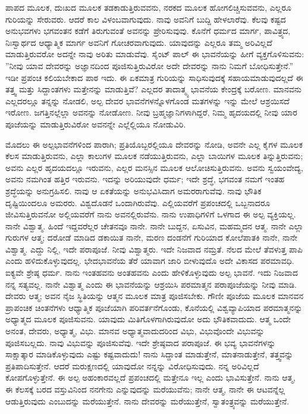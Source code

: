 ಪಾಪದ ಮೂಲಕ, ದುಃಖದ ಮೂಲಕ ತಡಕಾಡುತ್ತಿರುವವನು, ನರಕದ ಮೂಲಕ ಹೋಗಲಿಚ್ಚಿಸುವವನು, ಎಲ್ಲರೂ ಗುರಿಯನ್ನು ಸೇರುವರು. ಆದರೆ ಕಾಲ ವಿಳಂಬವಾಗುವುದು. ನಾವು ಅವನಿಗೆ ಬುದ್ದಿ ಹೇಳಲಾರೆವು. ಕೆಲವು ಕಷ್ಟದ ಅನುಭವಗಳು ಭಗವಂತನ ಕಡೆಗೆ ತಿರುಗುವಂತೆ ಅವನನ್ನು ಪ್ರೇರಿಸುವುವು. ಕೊನೆಗೆ ಧರ್ಮದ ಮಾರ್ಗ, ಪಾವಿತ್ರ್ಯದ, ನಿಃಸ್ವಾರ್ಥದ ಆಧ್ಯಾತ್ಮಿಕ ಮಾರ್ಗ ಅವನಿಗೆ ಗೋಚರವಾಗುವುದು. ಯಾವುದನ್ನು ಎಲ್ಲರೂ ತಮ್ಮ ಅರಿವಿಲ್ಲದೆ ಮಾಡುತ್ತಿರುವರೋ ಅದನ್ನೇ ನಾವು ಅರಿತು ಮಾಡುವೆವು. ಸೈಂಟ್ ಪಾಲ್ ಈ ಭಾವನೆಯನ್ನು ಹೀಗೆ ವ್ಯಕ್ತಗೊಳಿಸುವನು: ''ನೀವು ಯಾವ ದೇವರನ್ನು ಅಜ್ಞಾನದಿಂದ ಪೂಜಿಸುತ್ತಿರುವಿರೋ ಅದೇ ದೇವರನ್ನು ನಾನು ನಿಮಗೆ ಬೋಧಿಸುತ್ತೇನೆ.'' ಇಡೀ ಪ್ರಪಂಚ ಕಲಿಯಬೇಕಾದ ಪಾಠ ಇದು. ಈ ಏಕಮಾತ್ರ ಗುರಿಯನ್ನು ಸಾಧಿಸುವುದಕ್ಕೆ ಸಹಾಯಮಾಡುವುದಲ್ಲದೆ ಈ ತತ್ತ್ವ ಮತ್ತು ಸಿದ್ದಾಂತಗಳು ಮತ್ತೇನನ್ನು ಮಾಡುತ್ತಿವೆ? ಎಲ್ಲದರ ತಾದಾತ್ಮ್ಯ ಭಾವನೆಯ ಕೇಂದ್ರಕ್ಕೆ ಬರೋಣ. ಮಾನವನು ಎಲ್ಲದರಲ್ಲೂ ತನ್ನನ್ನು ನೋಡಲಿ, ಅಲ್ಪ ದೇವರ ಭಾವನೆಗಳನ್ನೊಳಗೊಂಡ ಮತಗಳನ್ನು ಇನ್ನು ಮೇಲೆ ಆಶ್ರಯಿಸದೆ ಇರೋಣ. ಜಗತ್ತಿನಲ್ಲೆಲ್ಲಾ ಅವನನ್ನು ನೋಡೋಣ. ನೀವು ಬ್ರಹ್ಮಜ್ಞಾನಿಗಳಾಗಿದ್ದರೆ, ನಿಮ್ಮ ಹೃದಯದಲ್ಲಿ ನೀವು ಯಾರ ಪೂಜೆಯನ್ನು ಮಾಡುತ್ತಿರುವಿರೋ ಅವನನ್ನೇ ಎಲ್ಲೆಲ್ಲಿಯೂ ನೋಡುವಿರಿ.

ಮೊದಲು ಈ ಅಲ್ಪಭಾವನೆಗಳಿಂದ ಪಾರಾಗಿ; ಪ್ರತಿಯೊಬ್ಬರಲ್ಲಿಯೂ ದೇವರನ್ನು ನೋಡಿ, ಅವನೇ ಎಲ್ಲ ಕೈಗಳ ಮೂಲಕ ಕೆಲಸ ಮಾಡುತ್ತಿರುವನು, ಎಲ್ಲಾ ಕಾಲುಗಳ ಮೂಲಕ ನಡೆಯುತ್ತಿರುವನು, ಎಲ್ಲಾ ಬಾಯಿಗಳ ಮೂಲಕ ತಿನ್ನುತ್ತಿರುವನು; ಅವನು ಎಲ್ಲರ ಹೃದಯದಲ್ಲೂ ಇರುವನು, ಎಲ್ಲರ ಮನಸ್ಸಿನ ಮೂಲಕ ಆಲೋಚಿಸುತ್ತಿರುವನು. ಅವನು ಸ್ವಯಂವೇದ್ಯ, ಅವನು ನಮಗಿಂತ ಹತ್ತಿರ ಇರುವನು. ಇದನ್ನು ಅರಿಯುವುದೇ ಧರ್ಮ; ಇದೇ ಶ್ರದ್ಧೆ, ಭಗವಂತ ನಮಗೆ ಇಂತಹ ಶ್ರದ್ಧೆಯನ್ನು ಅನುಗ್ರಹಿಸಲಿ. ನಾವು ಆ ಏಕತೆಯನ್ನು ಅನುಭವಿಸಿದಾಗ ಅಮರರಾಗುವೆವು. ನಾವು ಭೌತಿಕ ದೃಷ್ಟಿಯಿಂದಲೂ ಅಮರರು. ವಿಶ್ವದೊಡನೆ ಒಂದಾಗಿರುವೆವು. ಎಲ್ಲಿಯವರೆಗೆ ಪ್ರಪಂಚದಲ್ಲಿ ಒಬ್ಬನಾದರೂ ಜೀವಿಸುತ್ತಿರುವನೋ ಅಲ್ಲಿಯವರೆಗೆ ನಾನು ಅವನಲ್ಲಿರುವೆನು. ನಾನು ಉಪಾಧಿಗಳಿಗೆ ಒಳಗಾದ ಈ ಅಲ್ಪ ವ್ಯಕ್ತಿಯಲ್ಲ. ನಾನೇ ವಿಶ್ವಾತ್ಮ. ಹಿಂದೆ ಇದ್ದವರೆಲ್ಲರ ಚೇತನವೂ ನಾನೇ. ನಾನೇ ಬುದ್ದನ, ಏಸುವಿನ, ಮಹಮ್ಮದನ ಆತ್ಮ. ನಾನೇ ಎಲ್ಲಾ ಗುರುಗಳ ಆತ್ಮ; ದರೋಡೆ ಮಾಡಿದ ಡಕಾಯಿತ ನಾನೇ, ಮರಣ ದಂಡನೆಗೆ ಗುರಿಯಾದ ಕೋಲೆಪಾತಕಿ ನಾನೇ, ನಾನೇ ವಿಶ್ವಾತ್ಮ. ಎದ್ದು ನಿಲ್ಲಿ, ಇದೇ ಪರಾಪೂಜೆ. ನೀವು ವಿಶ್ವಾತ್ಮರು. ಇದೇ ನಿಜವಾದ ನಮ್ರತೆ. ನೆಲದ ಮೇಲೆ ತೆವಳುತ್ತ ಪಾಪಿ ಎಂದು ಹಳಿದುಕೊಳ್ಳುವುದಲ್ಲ. ಭೇದಭಾವನೆಯ ತೆರೆ ಯಾವಾಗ ಜಾರಿ ಬೀಳುವುದೊ ಅದೇ ವಿಕಾಸದ ಪರಮಾವಧಿ. ಐಕ್ಯವೇ ಶ್ರೇಷ್ಠ ಧರ್ಮ. ನಾನು ಇಂತಹವನು ಅಂತಹವನು ಎಂದು ಹೇಳಿಕೊಳ್ಳುವುದು ಅಲ್ಪ ಭಾವನೆ. ಇದು ನಿಜವಾದ ನನ್ನ ಸತ್ಯವಲ್ಲ. ನಾನೇ ವಿಶ್ವಾತ್ಮ ಎಂದು ಈ ಭಾವನೆಯನ್ನು ಆಶ್ರಯಿಸಿ ಪರಮಾತ್ಮನ ಪರಾಪೂಜೆಯನ್ನು ನೀವು ಮಾಡಿ. ದೇವರು ಆತ್ಮ; ಅವನ ನೈಜ ಸ್ಥಿತಿಯನ್ನು ಆತ್ಮನ ಮೂಲಕ ಮಾತ್ರ ಪೂಜಿಸಬೇಕು. ಗೌಣೀ ಪೂಜೆಯ ಮೂಲಕ ಮಾನವನ ಪ್ರಾಪಂಚಿಕ ಚಿಂತನೆಗಳು ಆಧ್ಯಾತ್ಮಿಕ ಪೂಜೆಯಾಗಿ ಪರಿವರ್ತನೆಗೊಂಡು, ಕೊನೆಯಲ್ಲಿ ವಿಶ್ವವ್ಯಾಪಿಯಾದ ಪರಮಾತ್ಮನನ್ನು ಅಧ್ಯಾತ್ಮದ ಮೂಲಕ ಪೂಜಿಸುವನು. ಯಾವುದು ಮಿತಿಗೊಳಗಾಗಿರುವುದೋ ಅದು ಭೌತಿಕವಾದುದು. ಆತ್ಮ ಒಂದೇ ಅನಂತ, ದೇವರು, ಅಧ್ಯಾತ್ಮ, ವಿಭು. ಮಾನವ ಅಧ್ಯಾತ್ಮವಾದುದರಿಂದ ವಿಭು, ವಿಭುವೊಂದೇ ವಿಭುವನ್ನು ಪೂಜಿಸಬಲ್ಲದು. ನಾವು ವಿಭುವನ್ನು ಪೂಜಿಸುವೆವು. ಇದೇ ಶ್ರೇಷ್ಠವಾದ ಪರಾಪೂಜೆ. ಈ ಭವ್ಯ ಭಾವನೆಗಳನ್ನು ಸಾಕ್ಷಾತ್ಕಾರ ಮಾಡಿಕೊಳ್ಳುವುದು ಎಷ್ಟು ಕಷ್ಟವಾದುದು! ನಾನು ಸಿದ್ದಾಂತ ಮಾಡುತ್ತೇನೆ, ಮಾತನಾಡುತ್ತೇನೆ, ತತ್ತ್ವವನ್ನು ಪ್ರತಿಪಾದಿಸುತ್ತೇನೆ. ಆದರೆ ಮರುಕ್ಷಣದಲ್ಲಿ ಯಾವುದೋ ನನ್ನನ್ನು ವಿರೋಧಿಸುವುದು. ನನ್ನ ಅರಿವಿಲ್ಲದೆ ಕೋಪಗೊಳ್ಳುತ್ತೇನೆ. ಈ ಅಲ್ಪ ಅಹಂಕಾರವಲ್ಲದೆ ಪ್ರಪಂಚದಲ್ಲಿ ಮತ್ತೇನೂ ಇಲ್ಲ ಎಂದು ಭಾವಿಸುತ್ತೇನೆ. ನಾನು ಆತ್ಮ, ಈ ಕೆಲಸಕ್ಕೆ ಬರದ ವಸ್ತುವಿನಿಂದ ನನಗೇನು ಎನ್ನುವುದನ್ನು ಮರೆಯುವೆನು; ನಾನೇ ಆತ್ಮ, ನಾನೇ ಈ ಆಟವನ್ನೆಲ್ಲ ಆಡುತ್ತಿರುವುದು ಎಂಬುದನ್ನು ಮರೆಯುತ್ತೇನೆ. ನಾನು ದೇವರನ್ನು ಮರೆಯುತ್ತೇನೆ, ಸ್ವಾತಂತ್ರ್ಯವನ್ನು ಮರೆಯುತ್ತೇನೆ.

